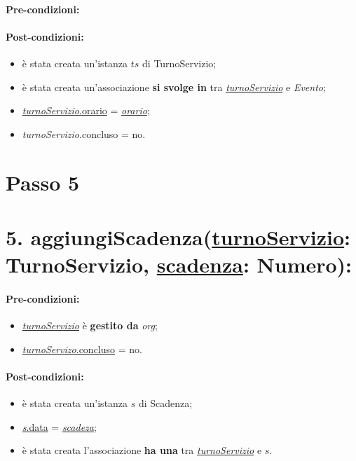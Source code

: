 \paragraph{Pre-condizioni:}

\paragraph{Post-condizioni:}
\begin{itemize}
    \item è stata creata un'istanza $ts$ di TurnoServizio;
   \item è stata creata un'associazione \textbf{si svolge in} tra \underline{\textit{turnoServizio}} e \textit{Evento};
    \item \underline{\textit{turnoServizio}.orario} = \underline{\textit{orario}};
    \item \textit{turnoServizio}.concluso  = no.
\end{itemize}


\section{Passo 5}
\section*{5. aggiungiScadenza(\underline{turnoServizio}: TurnoServizio, \underline{scadenza}: Numero):}

\paragraph{Pre-condizioni:}
\begin{itemize}
     \item \underline{\textit{turnoServizio}} è \textbf{gestito da} {\textit{org}};
   \item \underline{\textit{turnoServizo}.concluso} = no.
\end{itemize}

\paragraph{Post-condizioni:}  
\begin{itemize}
 \item è stata creata un'istanza $s$ di Scadenza;
 \item \underline{\textit{s}.data} = \underline{\textit{scadeza}};
 \item è stata creata l'associazione \textbf{ha una} tra \underline{\textit{turnoServizio}} e $s$.
\end{itemize}

